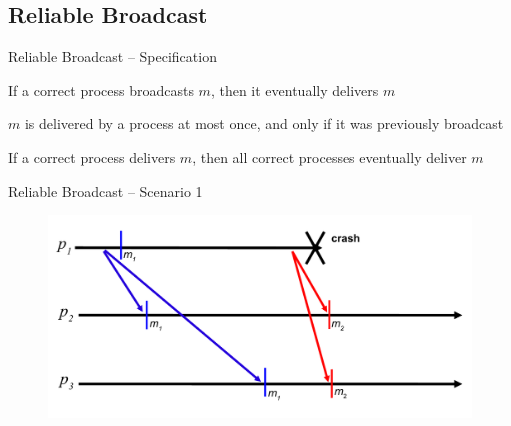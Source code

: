 \subsection{Reliable Broadcast}

\begin{frame}{Reliable Broadcast -- Specification}

\begin{definition}[RB1 -- Validity]
If a correct process broadcasts $m$, then it eventually delivers $m$
\end{definition}

\begin{definition}
$m$ is delivered by a process at most once, and only if 
it was previously broadcast
\end{definition}

\begin{definition}[RB3 -- Agreement]
If a correct process delivers $m$, then all correct processes eventually deliver $m$
\end{definition}



\end{frame}

\begin{frame}{Reliable Broadcast -- Scenario 1}


\begin{figure}
\includegraphics[width=\textwidth]{rb-scenario1}
\end{figure}



\end{frame}


